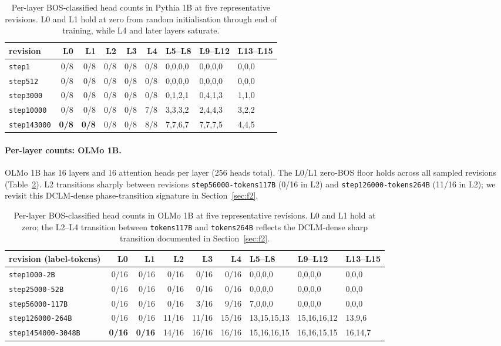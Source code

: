 \documentclass[11pt]{article}
\begin{document}
\begin{table}[t]
\centering
\caption{Per-layer BOS-classified head counts in Pythia 1B at five
representative revisions. L0 and L1 hold at zero from random initialisation
through end of training, while L4 and later layers saturate.}
\label{tab:bos_pythia}
\small
\begin{tabular}{l r r r r r l l l}
\toprule
revision & L0 & L1 & L2 & L3 & L4 & L5--L8 & L9--L12 & L13--L15 \\
\midrule
\texttt{step1}      & 0/8 & 0/8 & 0/8 & 0/8 & 0/8 & 0,0,0,0 & 0,0,0,0 & 0,0,0 \\
\texttt{step512}    & 0/8 & 0/8 & 0/8 & 0/8 & 0/8 & 0,0,0,0 & 0,0,0,0 & 0,0,0 \\
\texttt{step3000}   & 0/8 & 0/8 & 0/8 & 0/8 & 0/8 & 0,1,2,1 & 0,4,1,3 & 1,1,0 \\
\texttt{step10000}  & 0/8 & 0/8 & 0/8 & 0/8 & 7/8 & 3,3,3,2 & 2,4,4,3 & 3,2,2 \\
\texttt{step143000} & \textbf{0/8} & \textbf{0/8} & 0/8 & 0/8 & 8/8 & 7,7,6,7 & 7,7,7,5 & 4,4,5 \\
\bottomrule
\end{tabular}
\end{table}

\paragraph{Per-layer counts: OLMo 1B.} OLMo 1B has 16 layers and 16 attention
heads per layer (256 heads total). The L0/L1 zero-BOS floor holds across all
sampled revisions (Table~\ref{tab:bos_olmo}). L2 transitions sharply between
revisions \texttt{step56000-tokens117B} (0/16 in L2) and
\texttt{step126000-tokens264B} (11/16 in L2); we revisit this DCLM-dense
phase-transition signature in Section~\ref{sec:f2}.

\begin{table}[t]
\centering
\caption{Per-layer BOS-classified head counts in OLMo 1B at five
representative revisions. L0 and L1 hold at zero; the L2--L4 transition
between \texttt{tokens117B} and \texttt{tokens264B} reflects the
DCLM-dense sharp transition documented in Section~\ref{sec:f2}.}
\label{tab:bos_olmo}
\small
\begin{tabular}{l r r r r r l l l}
\toprule
revision (label-tokens) & L0 & L1 & L2 & L3 & L4 & L5--L8 & L9--L12 & L13--L15 \\
\midrule
\texttt{step1000-2B}     & 0/16 & 0/16 & 0/16 & 0/16 & 0/16 & 0,0,0,0 & 0,0,0,0 & 0,0,0 \\
\texttt{step25000-52B}   & 0/16 & 0/16 & 0/16 & 0/16 & 0/16 & 0,0,0,0 & 0,0,0,0 & 0,0,0 \\
\texttt{step56000-117B}  & 0/16 & 0/16 & 0/16 & 3/16 & 9/16 & 7,0,0,0 & 0,0,0,0 & 0,0,0 \\
\texttt{step126000-264B} & 0/16 & 0/16 & 11/16 & 11/16 & 15/16 & 13,15,15,13 & 15,16,16,12 & 13,9,6 \\
\texttt{step1454000-3048B} & \textbf{0/16} & \textbf{0/16} & 14/16 & 16/16 & 16/16 & 15,16,16,15 & 16,16,15,15 & 16,14,7 \\
\bottomrule
\end{tabular}
\end{table}
\end{document}
